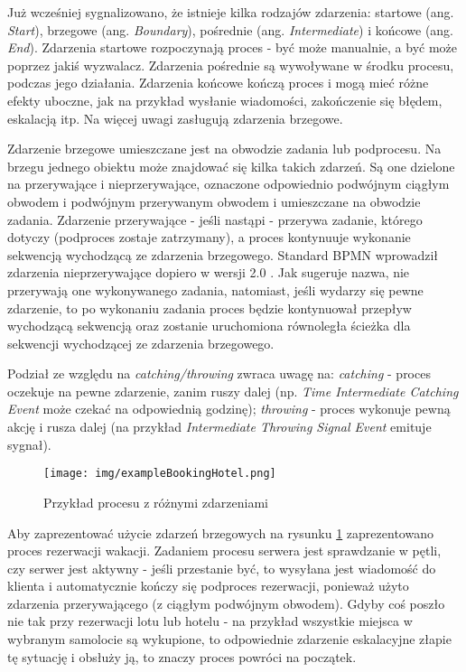 \documentclass[declaration,shortabstract,mgr]{iithesis}
\newcommand{\bpmn}{BPMN }
\begin{document}
Już wcześniej sygnalizowano, że istnieje kilka rodzajów zdarzenia: startowe (ang. \textit{Start}), brzegowe (ang. \textit{Boundary}), pośrednie (ang. \textit{Intermediate}) i końcowe (ang. \textit{End}). Zdarzenia startowe rozpoczynają proces - być może manualnie, a być może poprzez jakiś wyzwalacz. Zdarzenia pośrednie są wywoływane w środku procesu, podczas jego działania. Zdarzenia końcowe kończą proces i mogą mieć różne efekty uboczne, jak na przykład wysłanie wiadomości, zakończenie się błędem, eskalacją itp. Na więcej uwagi zasługują zdarzenia brzegowe.

Zdarzenie brzegowe umieszczane jest na obwodzie zadania lub podprocesu. Na brzegu jednego obiektu może znajdować się kilka takich zdarzeń. Są one dzielone na przerywające i nieprzerywające, oznaczone odpowiednio podwójnym ciągłym obwodem i podwójnym przerywanym obwodem i umieszczane na obwodzie zadania. Zdarzenie przerywające - jeśli nastąpi - przerywa zadanie, którego dotyczy (podproces zostaje zatrzymany), a proces kontynuuje wykonanie sekwencją wychodzącą ze zdarzenia brzegowego. Standard \bpmn wprowadził zdarzenia nieprzerywające dopiero w wersji 2.0 \cite{bruce-silver-bpmn-boundary-events-v2}. Jak sugeruje nazwa, nie przerywają one wykonywanego zadania, natomiast, jeśli wydarzy się pewne zdarzenie, to po wykonaniu zadania proces będzie kontynuował przepływ wychodzącą sekwencją oraz zostanie uruchomiona równoległa ścieżka dla sekwencji wychodzącej ze zdarzenia brzegowego.

 Podział ze względu na \textit{catching/throwing} zwraca uwagę na: \textit{catching} - proces oczekuje na pewne zdarzenie, zanim ruszy dalej (np. \textit{Time Intermediate Catching Event} może czekać na odpowiednią godzinę); \textit{throwing} - proces wykonuje pewną akcję i rusza dalej (na przykład \textit{Intermediate Throwing Signal Event} emituje sygnał). 

\begin{figure}[H]
    \texttt{[image: img/exampleBookingHotel.png]}
    \caption{Przykład procesu z różnymi zdarzeniami}
    \label{fig:exampleBookingHotel}
\end{figure}

Aby zaprezentować użycie zdarzeń brzegowych na rysunku \ref{fig:exampleBookingHotel} zaprezentowano proces rezerwacji wakacji. Zadaniem procesu serwera jest sprawdzanie w pętli, czy serwer jest aktywny - jeśli przestanie być, to wysyłana jest wiadomość do klienta i automatycznie kończy się podproces rezerwacji, ponieważ użyto zdarzenia przerywającego (z ciągłym podwójnym obwodem). Gdyby coś poszło nie tak przy rezerwacji lotu lub hotelu - na przykład wszystkie miejsca w wybranym samolocie są wykupione, to odpowiednie zdarzenie eskalacyjne złapie tę sytuację i obsłuży ją, to znaczy proces powróci na początek.
\end{document}
